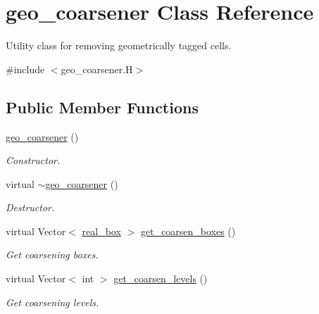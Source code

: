 \hypertarget{classgeo__coarsener}{}\section{geo\+\_\+coarsener Class Reference}
\label{classgeo__coarsener}


Utility class for removing geometrically tagged cells.  




{\ttfamily \#include $<$geo\+\_\+coarsener.\+H$>$}

\subsection*{Public Member Functions}
\begin{DoxyCompactItemize}
\item 
\hyperlink{classgeo__coarsener_a746a45f02a4e0c3ef9a1374564d96863}{geo\+\_\+coarsener} ()
\begin{DoxyCompactList}\small\item\em Constructor. \end{DoxyCompactList}\item 
virtual \hyperlink{classgeo__coarsener_a21c88ddd5d735e34df7526275c5ca08c}{$\sim$geo\+\_\+coarsener} ()
\begin{DoxyCompactList}\small\item\em Destructor. \end{DoxyCompactList}\item 
virtual Vector$<$ \hyperlink{classreal__box}{real\+\_\+box} $>$ \hyperlink{classgeo__coarsener_a9c833b296c7559eb7c4661b1e31d3421}{get\+\_\+coarsen\+\_\+boxes} ()
\begin{DoxyCompactList}\small\item\em Get coarsening boxes. \end{DoxyCompactList}\item 
virtual Vector$<$ int $>$ \hyperlink{classgeo__coarsener_acadfd9a5b0417eabbd1397bdae499444}{get\+\_\+coarsen\+\_\+levels} ()
\begin{DoxyCompactList}\small\item\em Get coarsening levels. \end{DoxyCompactList}\end{DoxyCompactItemize}
